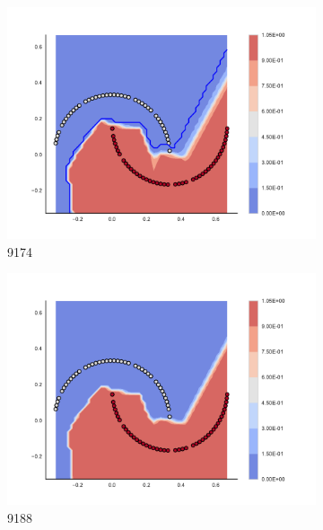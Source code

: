 \begin{figure}[h]
\begin{subfigure}[b]{0.09\textwidth}
    \includegraphics[clip, trim=2.35cm 1.75cm 4.5cm 0cm,width=\textwidth]{img/convergence/9174.pdf}
    \caption{9174}
    \label{fig:convergence_9174}
\end{subfigure}
%
\begin{subfigure}[b]{0.09\textwidth}
    \includegraphics[clip, trim=2.35cm 1.75cm 4.5cm 0cm,width=\textwidth]{img/convergence/9188.pdf}
    \caption{9188}
    \label{fig:convergence_9188}
\end{subfigure}
%
\begin{subfigure}[b]{0.09\textwidth}

\end{subfigure}
\end{figure}

